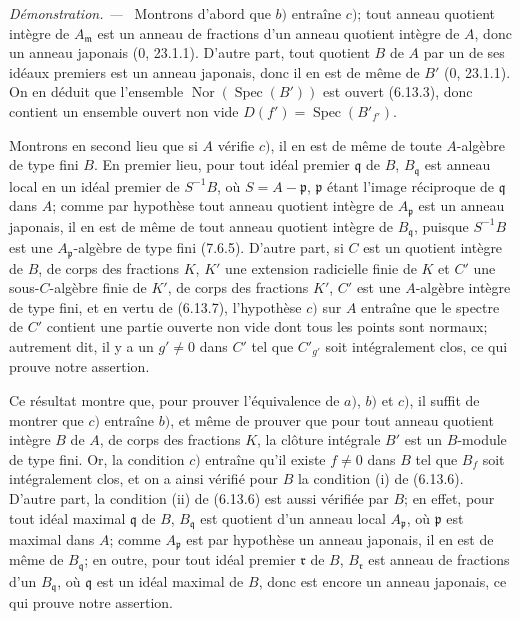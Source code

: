 \documentclass[10pt,oneside]{book}
\newcommand{\oldpage}[2][]{%
  \setcounter{footnote}{0}%
  \marginpar{\scriptsize\textbf{#1}~|~#2}\ignorespaces}
\newenvironment{proof}{%
  \par\medskip\noindent\textit{Démonstration. ---\ }}{\par}
\begin{document}
\begin{proof}
Montrons d'abord que $b)$ entraîne $c)$; tout anneau quotient intègre de
$A_{\mathfrak m}$ est un anneau de fractions d'un anneau quotient intègre de
$A$, donc un anneau japonais (0, 23.1.1). D'autre part, tout quotient $B$ de
$A$ par un de ses idéaux premiers est un anneau japonais, donc il en est de
même de $B'$ (0, 23.1.1). On en déduit que l'ensemble
$\operatorname{Nor}(\operatorname{Spec}(B'))$ est ouvert (6.13.3), donc
contient un ensemble ouvert non vide
$D(f')=\operatorname{Spec}(B'_{f'})$.

\oldpage[IV-2]{213}

Montrons en second lieu que si $A$ vérifie $c)$, il en est de même de toute
$A$-algèbre de type fini $B$. En premier lieu, pour tout idéal premier
$\mathfrak q$ de $B$, $B_{\mathfrak q}$ est anneau local en un idéal premier
de $S^{-1}B$, où $S=A-\mathfrak p$, $\mathfrak p$ étant l'image réciproque de
$\mathfrak q$ dans $A$; comme par hypothèse tout anneau quotient intègre de
$A_{\mathfrak p}$ est un anneau japonais, il en est de même de tout anneau
quotient intègre de $B_{\mathfrak q}$, puisque $S^{-1}B$ est une
$A_{\mathfrak p}$-algèbre de type fini (7.6.5). D'autre part, si $C$ est un
quotient intègre de $B$, de corps des fractions $K$, $K'$ une extension
radicielle finie de $K$ et $C'$ une sous-$C$-algèbre finie de $K'$, de corps
des fractions $K'$, $C'$ est une $A$-algèbre intègre de type fini, et en vertu
de (6.13.7), l'hypothèse $c)$ sur $A$ entraîne que le spectre de $C'$ contient
une partie ouverte non vide dont tous les points sont normaux; autrement dit,
il y a un $g'\neq0$ dans $C'$ tel que $C'_{g'}$ soit intégralement clos, ce qui
prouve notre assertion.

Ce résultat montre que, pour prouver l'équivalence de $a)$, $b)$ et $c)$, il
suffit de montrer que $c)$ entraîne $b)$, et même de prouver que pour tout
anneau quotient intègre $B$ de $A$, de corps des fractions $K$, la clôture
intégrale $B'$ est un $B$-module de type fini. Or, la condition $c)$ entraîne
qu'il existe $f\neq0$ dans $B$ tel que $B_f$ soit intégralement clos, et on a
ainsi vérifié pour $B$ la condition (i) de (6.13.6). D'autre part, la condition
(ii) de (6.13.6) est aussi vérifiée par $B$; en effet, pour tout idéal maximal
$\mathfrak q$ de $B$, $B_{\mathfrak q}$ est quotient d'un anneau local
$A_{\mathfrak p}$, où $\mathfrak p$ est maximal dans $A$; comme
$A_{\mathfrak p}$ est par hypothèse un anneau japonais, il en est de même de
$B_{\mathfrak q}$; en outre, pour tout idéal premier $\mathfrak r$ de $B$,
$B_{\mathfrak r}$ est anneau de fractions d'un $B_{\mathfrak q}$, où
$\mathfrak q$ est un idéal maximal de $B$, donc est encore un anneau japonais,
ce qui prouve notre assertion.


\end{proof}
\end{document}
